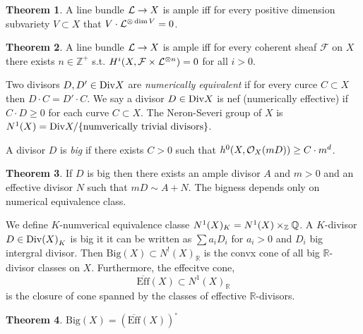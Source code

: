 \documentclass[12pt]{extarticle}
\newcommand{\Z}{\mathbb{Z}}
\newcommand{\R}{\mathbb{R}}
\theoremstyle{definition}
\newtheorem{theorem}{Theorem}[section]
\newenvironment{definition}[1][Definition:]{\begin{trivlist}
\item[\hskip \labelsep {\bfseries #1}]}{\end{trivlist}}
\newcommand{\F}{\mathcal{F}}
\begin{document}
\begin{theorem}
A line bundle $\mathcal{L} \to X$ is ample iff for every positive dimension subvariety $V \subset X$ that $V \cdot \mathcal{L}^{\otimes \dim{V}} = 0$.
\end{theorem}

\begin{theorem}
A line bundle $\mathcal{L} \to X$ is ample iff for every coherent sheaf $\F$ on $X$ there exists $n \in \Z^{+}$ s.t. $H^i(X, \F \times \L^{\otimes n}) = 0$ for all $i > 0$.
\end{theorem}

\begin{definition}
Two divisors $D, D' \in \mathrm{Div}{X}$ are \textit{numerically equivalent} if for every curce $C \subset X$ then $D \cdot C = D' \cdot C$. We say a divisor $D \in \mathrm{Div}{X}$ is nef (numerically effective) if $C \cdot D \ge 0$ for each curve $C \subset X$. The Neron-Severi group of $X$ is $N^1(X) = \mathrm{Div}{X} / \{ \text{numverically trivial divisors} \}$. 
\end{definition}

\begin{definition}
A divisor $D$ is \textit{big} if there exists $C > 0$ such that $h^0(X, \mathcal{O}_{X}(m D)) \ge C \cdot m^d$. 
\end{definition}

\begin{theorem}
If $D$ is big then there exists an ample divisor $A$ and $m > 0$ and an effective divisor $N$ such that $m D \sim A + N$. The bigness depends only on numerical equivalence class. 
\end{theorem}

\renewcommand{\Big}{\mathrm{Big}}
\newcommand{\Eff}{\mathrm{Eff}}

\begin{definition}
We define $K$-numverical equivalence classe $N^1(X)_K = N^1(X) \times_\Z \Q$. A $K$-divisor $D \in \mathrm{Div}{(X)}_K$ is big it it can be written as $\sum a_i D_i$ for $a_i > 0$ and $D_i$ big intergral divisor. Then $\Big(X) \subset N^!(X)_\R$ is the convx cone of all big $\R$-divisor classes on $X$. Furthermore, the effecitve cone,
\[ \overline{\Eff}(X) \subset N^1(X)_\R \]
is the closure of cone spanned by the classes of effective $\R$-divisors. 
\end{definition}

\begin{theorem}
$\Big(X) = (\overline{\Eff}(X))^\circ$
\end{theorem}
\end{document}

